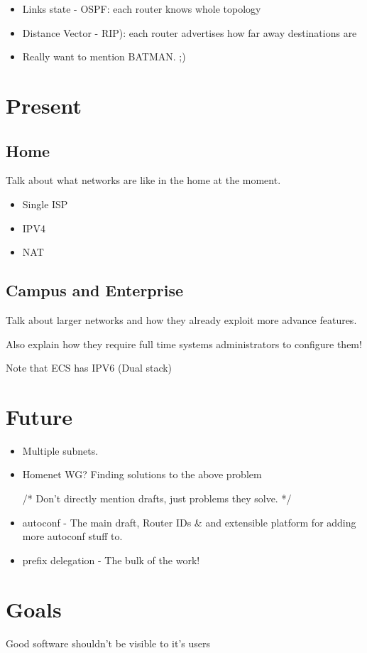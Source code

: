 \documentclass[12pt]{report}
\begin{document}
\begin{itemize}
\item Links state - OSPF: each router knows whole topology
\item Distance Vector - RIP): each router advertises how far away destinations are
\item Really want to mention BATMAN. ;)
\end{itemize}

\section{Present}
\subsection{Home}
Talk about what networks are like in the home at the moment.
\begin{itemize} 
\item Single ISP
\item IPV4
\item NAT 
\end{itemize}

\subsection{Campus and Enterprise}
Talk about larger networks and how they already exploit more advance features.

Also explain how they require full time systems administrators to configure them!

Note that ECS has IPV6 (Dual stack)

\section{Future}
\begin{itemize}
\item Multiple subnets. 
\item Homenet WG? Finding solutions to the above problem

/* Don't directly mention drafts, just problems they solve. */

\item autoconf - The main draft, Router IDs \& and extensible platform for adding more autoconf stuff to.
\item prefix delegation - The bulk of the work!
\end{itemize}

\section{Goals}
Good software shouldn't be visible to it's users
\end{document}
